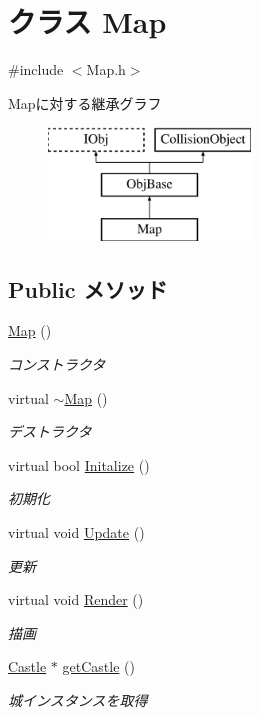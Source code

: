 \hypertarget{class_map}{\section{クラス Map}
\label{class_map}
}


{\ttfamily \#include $<$Map.\-h$>$}

Mapに対する継承グラフ\begin{figure}[H]
\begin{center}
\leavevmode
\includegraphics[height=3.000000cm]{dd/d11/class_map}
\end{center}
\end{figure}
\subsection*{Public メソッド}
\begin{DoxyCompactItemize}
\item 
\hyperlink{class_map_a0f5ad0fd4563497b4214038cbca8b582}{Map} ()
\begin{DoxyCompactList}\small\item\em コンストラクタ \end{DoxyCompactList}\item 
virtual \hyperlink{class_map_aa403fbe09394ccf39747588f5168e3b2}{$\sim$\-Map} ()
\begin{DoxyCompactList}\small\item\em デストラクタ \end{DoxyCompactList}\item 
virtual bool \hyperlink{class_map_a7e3e81c662125913e1b29fe0a257c7de}{Initalize} ()
\begin{DoxyCompactList}\small\item\em 初期化 \end{DoxyCompactList}\item 
virtual void \hyperlink{class_map_a61efe2e1ec3f41d90bcbf826893404f1}{Update} ()
\begin{DoxyCompactList}\small\item\em 更新 \end{DoxyCompactList}\item 
virtual void \hyperlink{class_map_a211a219e3ba75b378e5bca7a40df82c6}{Render} ()
\begin{DoxyCompactList}\small\item\em 描画 \end{DoxyCompactList}\item 
\hyperlink{class_castle}{Castle} $\ast$ \hyperlink{class_map_a607b2188cbb804109dab92b23a3fffd1}{get\-Castle} ()
\begin{DoxyCompactList}\small\item\em 城インスタンスを取得 \end{DoxyCompactList}\end{DoxyCompactItemize}
